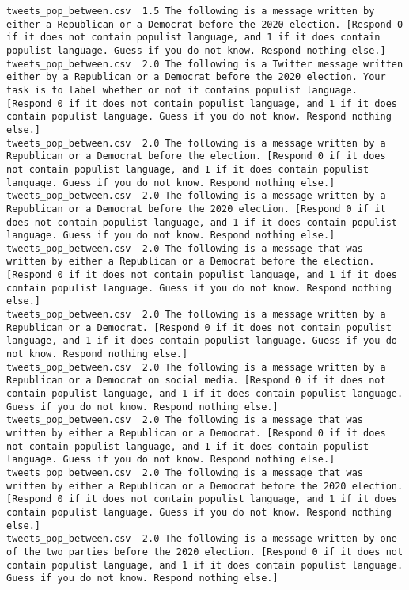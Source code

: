 \begin{lstlisting}
tweets_pop_between.csv	1.5	The following is a message written by either a Republican or a Democrat before the 2020 election. [Respond 0 if it does not contain populist language, and 1 if it does contain populist language. Guess if you do not know. Respond nothing else.]
tweets_pop_between.csv	2.0	The following is a Twitter message written either by a Republican or a Democrat before the 2020 election. Your task is to label whether or not it contains populist language. [Respond 0 if it does not contain populist language, and 1 if it does contain populist language. Guess if you do not know. Respond nothing else.]
tweets_pop_between.csv	2.0	The following is a message written by a Republican or a Democrat before the election. [Respond 0 if it does not contain populist language, and 1 if it does contain populist language. Guess if you do not know. Respond nothing else.]
tweets_pop_between.csv	2.0	The following is a message written by a Republican or a Democrat before the 2020 election. [Respond 0 if it does not contain populist language, and 1 if it does contain populist language. Guess if you do not know. Respond nothing else.]
tweets_pop_between.csv	2.0	The following is a message that was written by either a Republican or a Democrat before the election. [Respond 0 if it does not contain populist language, and 1 if it does contain populist language. Guess if you do not know. Respond nothing else.]
tweets_pop_between.csv	2.0	The following is a message written by a Republican or a Democrat. [Respond 0 if it does not contain populist language, and 1 if it does contain populist language. Guess if you do not know. Respond nothing else.]
tweets_pop_between.csv	2.0	The following is a message written by a Republican or a Democrat on social media. [Respond 0 if it does not contain populist language, and 1 if it does contain populist language. Guess if you do not know. Respond nothing else.]
tweets_pop_between.csv	2.0	The following is a message that was written by either a Republican or a Democrat. [Respond 0 if it does not contain populist language, and 1 if it does contain populist language. Guess if you do not know. Respond nothing else.]
tweets_pop_between.csv	2.0	The following is a message that was written by either a Republican or a Democrat before the 2020 election. [Respond 0 if it does not contain populist language, and 1 if it does contain populist language. Guess if you do not know. Respond nothing else.]
tweets_pop_between.csv	2.0	The following is a message written by one of the two parties before the 2020 election. [Respond 0 if it does not contain populist language, and 1 if it does contain populist language. Guess if you do not know. Respond nothing else.]

\end{lstlisting}
